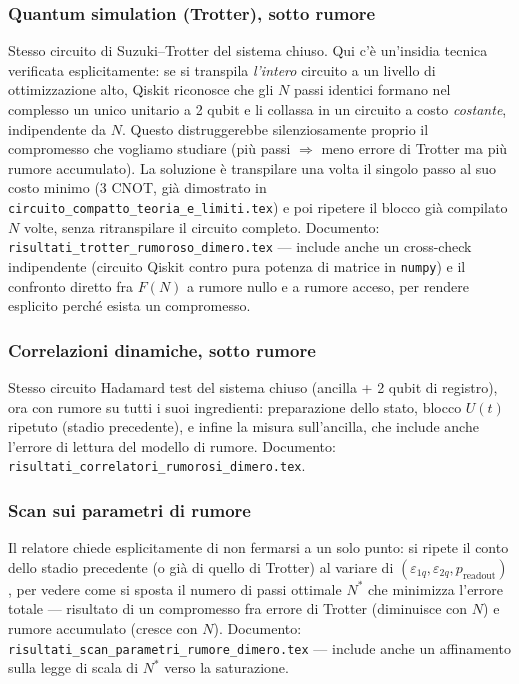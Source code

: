 \documentclass[11pt,a4paper]{article}
\begin{document}
\subsubsection{Quantum simulation (Trotter), sotto rumore}
\label{subsec:trotter}

Stesso circuito di Suzuki--Trotter del sistema chiuso. Qui c'è
un'insidia tecnica verificata esplicitamente: se si transpila
\emph{l'intero} circuito a un livello di ottimizzazione alto, Qiskit
riconosce che gli $N$ passi identici formano nel complesso un unico
unitario a 2 qubit e li collassa in un circuito a costo
\emph{costante}, indipendente da $N$. Questo distruggerebbe
silenziosamente proprio il compromesso che vogliamo studiare (più passi
$\Rightarrow$ meno errore di Trotter ma più rumore accumulato). La
soluzione è transpilare una volta il singolo passo al suo costo minimo
(3 CNOT, già dimostrato in
\texttt{circuito\_compatto\_teoria\_e\_limiti.tex}) e poi ripetere il
blocco già compilato $N$ volte, senza ritranspilare il circuito
completo. Documento: \texttt{risultati\_trotter\_rumoroso\_dimero.tex}
--- include anche un cross-check indipendente (circuito Qiskit contro
pura potenza di matrice in \texttt{numpy}) e il confronto diretto fra
$F(N)$ a rumore nullo e a rumore acceso, per rendere esplicito perché
esista un compromesso.

\subsubsection{Correlazioni dinamiche, sotto rumore}

Stesso circuito Hadamard test del sistema chiuso (ancilla + 2 qubit di
registro), ora con rumore su tutti i suoi ingredienti: preparazione
dello stato, blocco $U(t)$ ripetuto (stadio precedente), e infine la
misura sull'ancilla, che include anche l'errore di lettura del modello
di rumore. Documento:
\texttt{risultati\_correlatori\_rumorosi\_dimero.tex}.

\subsubsection{Scan sui parametri di rumore}

Il relatore chiede esplicitamente di non fermarsi a un solo punto: si
ripete il conto dello stadio precedente (o già di quello di Trotter) al
variare di $(\varepsilon_{1q},\varepsilon_{2q},p_\text{readout})$, per
vedere come si sposta il numero di passi ottimale $N^*$ che minimizza
l'errore totale --- risultato di un compromesso fra errore di Trotter
(diminuisce con $N$) e rumore accumulato (cresce con $N$). Documento:
\texttt{risultati\_scan\_parametri\_rumore\_dimero.tex} --- include anche
un affinamento sulla legge di scala di $N^*$ verso la saturazione.
\end{document}

